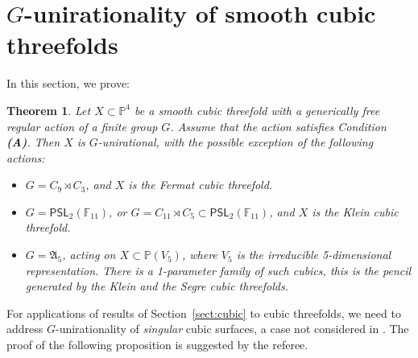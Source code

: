 \documentclass[12pt,reqno]{amsart}
\theoremstyle{plain}
\newtheorem{theo}[prop]{Theorem}
\theoremstyle{remark}
\theoremstyle{definition}
\numberwithin{equation}{section}
\def\fA{{\mathfrak A}}
\def\bP{{\mathbb P}}
\def\bF{{\mathbb F}}
\def\PSL{\mathsf{PSL}}
\begin{document}
\section{$G$-unirationality of smooth cubic threefolds}
\label{sect:smooth-3}



In this section, we prove:

\begin{theo}
    \label{thm:main-cubic}
Let $X\subset \bP^4$ be a smooth cubic threefold with a generically free regular action of a finite group $G$. Assume that the action satisfies Condition {\bf (A)}. 
Then $X$ is $G$-unirational, with 
the possible exception of the following actions: 
\begin{itemize}
    \item $G=C_9\rtimes C_3$, and $X$ is the Fermat cubic threefold.
    \item  $G=\PSL_2(\bF_{11})$, or $G= C_{11}\rtimes C_5\subset \PSL_2(\bF_{11})$, and $X$ is the Klein cubic threefold. 
    \item $G=\fA_5$, acting on $X\subset \bP(V_5)$, where $V_5$ is the irreducible 5-dimensional representation. There is a 1-parameter family of such cubics, this is the pencil generated by the Klein and the Segre cubic threefolds.
\end{itemize}
\end{theo}




For applications of results of Section~\ref{sect:cubic} to cubic threefolds, we need to address $G$-unirationality of {\em singular} cubic surfaces, a case not considered in \cite{Duncan}. The proof of the following proposition is suggested by the referee.
\end{document}
